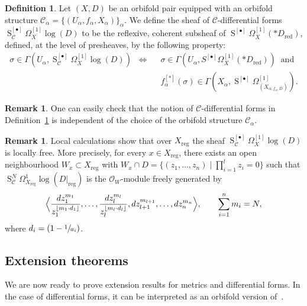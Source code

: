 \documentclass[10pt]{amsart}
\let\mathcal\mathscr
\let\scr\mathscr
\let\oldbullet\bullet
\newcommand{\sbullet}{{\scriptscriptstyle\oldbullet}}
\let\bullet\sbullet
\theoremstyle{plain}
\theoremstyle{definition}
\newtheorem{definition}[theorem]{Definition}
\newtheorem{remark}[theorem]{Remark}
\numberwithin{equation}{theorem}
\DeclareMathOperator{\red}{red}
\DeclareMathOperator{\reg}{reg}
\DeclareMathOperator{\Sym}{S}
\newcommand{\sO}{\scr{O}}
\begin{document}
\begin{definition}
\label{def:CDiff}
Let $(X,D)$ be an orbifold pair equipped with an orbifold structure
$\mathcal C_{\alpha} = \{ (U_{\alpha}, f_{\alpha}, X_{\alpha}) \}_{\alpha}$.
We define the sheaf of $\mathcal C$-differential forms $\Sym^{[\bullet]}_{\mathcal C} \Omega^{[1]}_X\log (D)$
to be the reflexive, coherent subsheaf of $\Sym^{[\bullet]} \Omega^{[1]}_X(*D_{\red})$, defined, at the level of
presheaves, by the following property:
\begin{align*}
\sigma \in \Gamma (U_{\alpha}, \Sym^{[\bullet]}_{\mathcal C} \Omega^{[1]}_X\log (D)) \; \; \Longleftrightarrow \;\;&
\sigma \in \Gamma(U_{\alpha}, S^{[\bullet]} \Omega^{[1]}_X(* D_{\red}) ) \; \; \text{and} \\
&f^{[*]}_{\alpha}(\sigma) \in \Gamma (X_{\alpha}, \Sym^{[\bullet]} \Omega^{[1]}_{(X_{\alpha, f_{\alpha}, D})} ).
\end{align*}
\end{definition}

\begin{remark}
One can easily check that the notion of $\mathcal C$-differential forms in Definition~\ref{def:CDiff}
is independent of the choice of the orbifold structure $\mathcal C_{\alpha}$.
\end{remark}

\begin{remark}
Local calculations show that over $X_{\reg}$ the sheaf $\Sym_{\mathcal C}^{[\bullet]}\Omega^{[1]}_{X}\log(D)$
is locally free. More precisely, for every $x\in X_{\reg}$, there
exists an open neighbourhood $W_x\subset X_{\reg}$ with $W_x\cap D = \{ (z_1, \ldots, z_n) \mid \prod_{i=1}^l z_i =0 \}$
such that $\Sym^N_{\mathcal C}\Omega^1_{X_{\reg}}\log (D|_{\reg})$ is the $\sO_W$-module
freely generated by
$$
\Bigl\langle \frac{dz_1^{m_1}}{z_1^{\lfloor m_1\cdot d_1 \rfloor}}, \ldots, \frac{dz_l^{m_l}}{z_l^{\lfloor m_l\cdot d_l \rfloor}},
dz_{l+1}^{m_{l+1}}, \ldots, dz_n^{m_n} \Bigr\rangle, \qquad\sum_{i=1}^n m_i = N,
$$
where $d_i= (1-\sfrac{1}{a_i})$.
\end{remark}

\subsection{Extension theorems}
We are now ready to prove extension results for metrics and differential forms.
In the case of differential forms, it can be interpreted as an
orbifold version of~\cite[Prop.\,3.1]{GKK08}.
\end{document}

